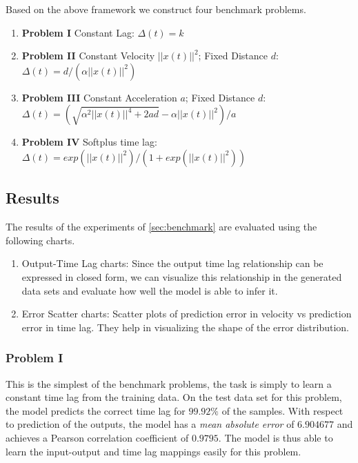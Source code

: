 \documentclass[twoside]{article}
\begin{document}
Based on the above framework we construct four benchmark problems.

\begin{enumerate}
\item \textbf{Problem I} Constant Lag: \newline 
$\Delta(t) = k$

\item \textbf{Problem II} Constant Velocity $||x(t)||^2$; Fixed Distance $d$: 
\newline $\Delta(t) = d/(\alpha ||x(t)||^2)$

\item \textbf{Problem III} Constant Acceleration $a$; Fixed Distance $d$: 
\newline $\Delta(t) = (\sqrt{\alpha^2||x(t)||^4 + 2ad} - \alpha||x(t)||^2)/a$

\item \textbf{Problem IV} Softplus time lag: 
\newline $\Delta(t) = exp\left(||x(t)||^2\right)/\left(1 + exp(||x(t)||^2)\right)$

\end{enumerate}

\subsection{Results}

The results of the experiments of \ref{sec:benchmark} are evaluated using the following charts.

\begin{enumerate}
    \item Output-Time Lag charts: Since the output time lag relationship can be expressed in closed form, we can visualize this relationship in the generated data sets and evaluate how well the model is able to infer it.
    \item Error Scatter charts: Scatter plots of prediction error in velocity vs prediction error in time lag. They help in visualizing the shape of the error distribution.
\end{enumerate}


\subsubsection{Problem I}

This is the simplest of the benchmark problems, the task is simply to learn a constant time lag from the training data. On the test data set for this problem, the model predicts the correct time lag for $99.92\%$ of the samples. With respect to prediction of the outputs, the model has a \emph{mean absolute error} of $6.904677$ and achieves a Pearson correlation coefficient of $0.9795$. The model is thus able to learn the input-output and time lag mappings easily for this problem.
\end{document}
